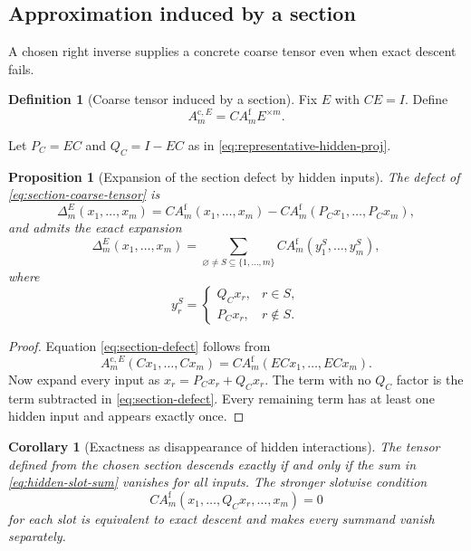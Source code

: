 \documentclass[11pt]{article}
\newtheorem{proposition}[theorem]{Proposition}
\newtheorem{corollary}[theorem]{Corollary}
\theoremstyle{definition}
\newtheorem{definition}[theorem]{Definition}
\theoremstyle{remark}
\newcommand{\fine}{\mathrm f}
\newcommand{\coarse}{\mathrm c}
\begin{document}
\subsection{Approximation induced by a section}
A chosen right inverse supplies a concrete coarse tensor even when exact descent fails.

\begin{definition}[Coarse tensor induced by a section]\label{def:section-coarse-tensor}
Fix $E$ with $CE=I$.  Define
\begin{equation}\label{eq:section-coarse-tensor}
  A_m^{\coarse,E}
  =
  CA_m^{\fine}E^{\times m}.
\end{equation}
\end{definition}

Let $P_C=EC$ and $Q_C=I-EC$ as in \eqref{eq:representative-hidden-proj}.

\begin{proposition}[Expansion of the section defect by hidden inputs]\label{prop:hidden-slot-expansion}
The defect of \eqref{eq:section-coarse-tensor} is
\begin{equation}\label{eq:section-defect}
  \Delta_m^E(x_1,\ldots,x_m)
  =
  CA_m^{\fine}(x_1,\ldots,x_m)
  -
  CA_m^{\fine}(P_Cx_1,\ldots,P_Cx_m),
\end{equation}
and admits the exact expansion
\begin{equation}\label{eq:hidden-slot-sum}
  \boxed{
  \Delta_m^E(x_1,\ldots,x_m)
  =
  \sum_{\varnothing\neq S\subseteq\{1,\ldots,m\}}
  CA_m^{\fine}(y_1^S,\ldots,y_m^S),}
\end{equation}
where
\[
  y_r^S=
  \begin{cases}
  Q_Cx_r,&r\in S,\\
  P_Cx_r,&r\notin S.
  \end{cases}
\]
\end{proposition}

\begin{proof}
Equation \eqref{eq:section-defect} follows from
\[
  A_m^{\coarse,E}(Cx_1,\ldots,Cx_m)
  =CA_m^{\fine}(ECx_1,\ldots,ECx_m).
\]
Now expand every input as $x_r=P_Cx_r+Q_Cx_r$.  The term with no $Q_C$ factor is the term subtracted in \eqref{eq:section-defect}.  Every remaining term has at least one hidden input and appears exactly once.
\end{proof}

\begin{corollary}[Exactness as disappearance of hidden interactions]\label{cor:hidden-interactions-exactness}
The tensor defined from the chosen section descends exactly if and only if the sum in \eqref{eq:hidden-slot-sum} vanishes for all inputs.  The stronger slotwise condition
\[
  CA_m^{\fine}(x_1,\ldots,Q_Cx_r,\ldots,x_m)=0
\]
for each slot is equivalent to exact descent and makes every summand vanish separately.
\end{corollary}
\end{document}
